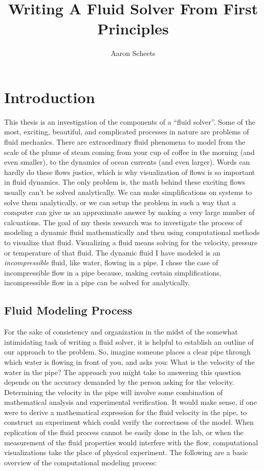 \documentclass[twocolumn,12pth]{article}
\title{Writing A Fluid Solver From First Principles}
\author{Aaron Scheets}
\begin{document}
\maketitle

\section{Introduction}

This thesis is an investigation of the components of a ``fluid solver''.
Some of the most, exciting, beautiful, and complicated processes in nature are problems of fluid mechanics.
There are extraordinary fluid phenomena to model from the scale of the plume of steam coming from your cup of coffee in the morning (and even smaller), to the dynamics of ocean currents (and even larger).
Words can hardly do these flows justice, which is why visualization of flows is so important in fluid dynamics.
The only problem is, the math behind these exciting flows usually can't be solved analytically. 
We can make simplifications on systems to solve them analytically, or we can setup the problem in such a way that a computer can give us an approximate answer by making a very large number of calcuations.
The goal of my thesis research was to investigate the process of modeling a dynamic fluid mathematically and then using computational methods to visualize that fluid.
Visualizing a fluid means solving for the velocity, pressure or temperature of that fluid.
The dynamic fluid I have modeled is an \textit{incompressible} fluid, like water, flowing in a pipe. 
I chose the case of incompressible flow in a pipe because, making certain simplifications, incompressible flow in a pipe can be solved for analytically. 

\subsection{Fluid Modeling Process}

For the sake of consistency and organization in the midst of the somewhat intimidating task of writing a fluid solver, it is helpful to establish an outline of our approach to the problem.
So, imagine someone places a clear pipe through which water is flowing in front of you, and asks you: What is the velocity of the water in the pipe?
The approach you might take to answering this question depends on the accuracy demanded by the person asking for the velocity.
Determining the velocity in the pipe will involve some combination of mathematical analysis and experimental verification.
It would make sense, if one were to derive a mathematical expression for the fluid velocity in the pipe, to construct an experiment which could verify the correctness of the model.
When replication of the fluid process cannot be easily done in the lab, or when the measurement of the fluid properties would interfere with the flow, computational visualizations take the place of physical experiment.
The following are a basic overview of the computational modeling process:
\vspace{2mm}
\end{document}
